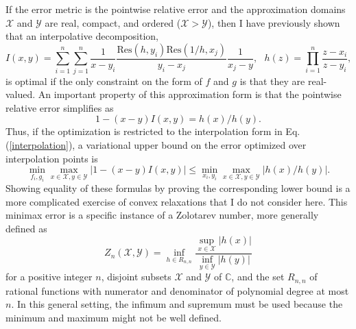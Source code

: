 \documentclass[12pt]{article}
\begin{document}
If the error metric is the pointwise relative error and the approximation domains $\mathcal{X}$ and $\mathcal{Y}$ are real, compact, and ordered ($\mathcal{X} > \mathcal{Y}$),
 then I have previously \cite{moussa2020minimaxseparationcauchykernel} shown that an interpolative decomposition,
\begin{equation} \label{interpolation}
 I(x,y) = \sum_{i=1}^n \sum_{j=1}^n \frac{1}{x-y_i} \frac{\mathrm{Res}(h,y_i) \mathrm{Res}(1/h,x_j)}{y_i - x_j} \frac{1}{x_j - y}, \ \ \ h(z) = \prod_{i=1}^{n} \frac{z-x_i}{z-y_i},
\end{equation}
 is optimal if the only constraint on the form of $f$ and $g$ is that they are real-valued.
An important property of this approximation form is that the pointwise relative error simplifies as
\begin{equation}
 1 - (x-y) I(x,y) = h(x) / h(y).
\end{equation}
Thus, if the optimization is restricted to the interpolation form in Eq.\@ (\ref{interpolation}), a variational upper bound on the error optimized over interpolation points is
\begin{equation} \label{minimax}
 \min_{f_i, g_i} \max_{x\in\mathcal{X}, y \in \mathcal{Y}} |1 - (x-y) I(x,y)| \le \min_{x_i,y_i} \max_{x\in\mathcal{X}, y \in \mathcal{Y}} | h(x) / h(y) |.
\end{equation}
Showing equality of these formulas by proving the corresponding lower bound is a more complicated exercise of convex relaxations that I do not consider here.
This minimax error is a specific instance of a Zolotarev number, more generally defined as
\begin{equation} \label{Z}
 Z_n(\mathcal{X}, \mathcal{Y}) = \inf_{h \in R_{n,n}} \frac{\sup_{x \in \mathcal{X}} |h(x)|}{\inf_{y \in \mathcal{Y}}|h(y)|}
\end{equation}
 for a positive integer $n$, disjoint subsets $\mathcal{X}$ and $\mathcal{Y}$ of $\mathbb{C}$, and the set $R_{n,n}$ of rational functions with numerator and denominator of polynomial degree at most $n$.
In this general setting, the infimum and supremum must be used because the minimum and maximum might not be well defined.
\end{document}
